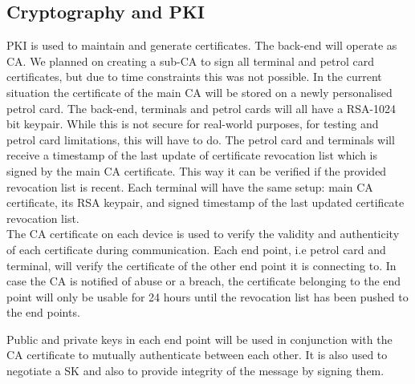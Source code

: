 \subsection{Cryptography and PKI}
PKI is used to maintain and generate certificates. The back-end will operate as CA. We planned on creating a sub-CA to sign all terminal and petrol card certificates, but due to time constraints this was not possible. In the current situation the certificate of the main CA will be stored on a newly personalised petrol card. The back-end, terminals and petrol cards will all have a RSA-1024 bit keypair. While this is not secure for real-world purposes, for testing and petrol card limitations, this will have to do. The petrol card and terminals will receive a timestamp of the last update of certificate revocation list which is signed by the main CA certificate. This way it can be verified if the provided revocation list is recent. Each terminal will have the same setup: main CA certificate, its RSA keypair, and signed timestamp of the last updated certificate revocation list. \\

The CA certificate on each device is used to verify the validity and authenticity of each certificate during communication. Each end point, i.e petrol card and terminal, will verify the certificate of the other end point it is connecting to. In case the CA is notified of abuse or a breach, the certificate belonging to the end point will only be usable for 24 hours until the revocation list has been pushed to the end points. %

Public and private keys in each end point will be used in conjunction with the CA certificate to mutually authenticate between each other. It is also used to negotiate a SK and also to provide integrity of the message by signing them.





